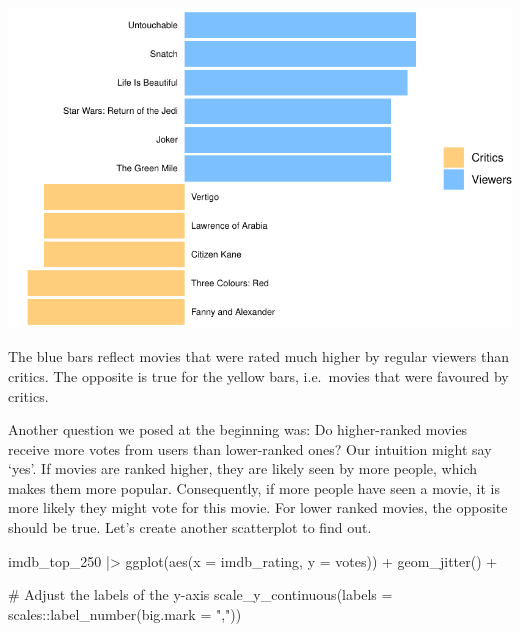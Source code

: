 \documentclass[
  letterpaper,
]{krantz}
\makeatletter
\newenvironment{Shaded}{\begin{snugshade}}{\end{snugshade}}
\newcommand{\AttributeTok}[1]{\textcolor[rgb]{0.40,0.45,0.13}{#1}}
\newcommand{\CommentTok}[1]{\textcolor[rgb]{0.37,0.37,0.37}{#1}}
\newcommand{\FunctionTok}[1]{\textcolor[rgb]{0.28,0.35,0.67}{#1}}
\newcommand{\NormalTok}[1]{\textcolor[rgb]{0.00,0.23,0.31}{#1}}
\newcommand{\SpecialCharTok}[1]{\textcolor[rgb]{0.37,0.37,0.37}{#1}}
\newcommand{\StringTok}[1]{\textcolor[rgb]{0.13,0.47,0.30}{#1}}
\newenvironment{kframe}{%
\medskip{}
\setlength{\fboxsep}{.8em}
 \def\at@end@of@kframe{}%
 \ifinner\ifhmode%
  \def\at@end@of@kframe{\end{minipage}}%
  \begin{minipage}{\columnwidth}%
 \fi\fi%
 \def\FrameCommand##1{\hskip\@totalleftmargin \hskip-\fboxsep
 \colorbox{shadecolor}{##1}\hskip-\fboxsep
     \hskip-\linewidth \hskip-\@totalleftmargin \hskip\columnwidth}%
 \MakeFramed {\advance\hsize-\width
   \@totalleftmargin\z@ \linewidth\hsize
   \@setminipage}}%
 {\par\unskip\endMakeFramed%
 \at@end@of@kframe}
\renewenvironment{Shaded}{\begin{kframe}}{\end{kframe}}
\makeatother
\begin{document}
\includegraphics{10_correlations_files/figure-pdf/discrepancy-movie-ratings-1.pdf}

The blue bars reflect movies that were rated much higher by regular
viewers than critics. The opposite is true for the yellow bars,
i.e.~movies that were favoured by critics.

Another question we posed at the beginning was: Do higher-ranked movies
receive more votes from users than lower-ranked ones? Our intuition
might say `yes'. If movies are ranked higher, they are likely seen by
more people, which makes them more popular. Consequently, if more people
have seen a movie, it is more likely they might vote for this movie. For
lower ranked movies, the opposite should be true. Let's create another
scatterplot to find out.

\begin{Shaded}
\begin{Highlighting}[]
\NormalTok{imdb\_top\_250 }\SpecialCharTok{|\textgreater{}}
  \FunctionTok{ggplot}\NormalTok{(}\FunctionTok{aes}\NormalTok{(}\AttributeTok{x =}\NormalTok{ imdb\_rating, }\AttributeTok{y =}\NormalTok{ votes)) }\SpecialCharTok{+}
  \FunctionTok{geom\_jitter}\NormalTok{() }\SpecialCharTok{+}
  
  \CommentTok{\# Adjust the labels of the y{-}axis}
  \FunctionTok{scale\_y\_continuous}\NormalTok{(}\AttributeTok{labels =}\NormalTok{ scales}\SpecialCharTok{::}\FunctionTok{label\_number}\NormalTok{(}\AttributeTok{big.mark =} \StringTok{","}\NormalTok{))}
\end{Highlighting}
\end{Shaded}
\end{document}
